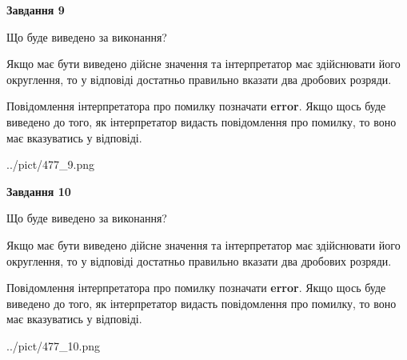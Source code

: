 \documentclass[12pt, ukrainian]{article}
\begin{document}
{\begin {Large}
{\begin {center}\textbf{Завдання 9}\end {center}}\par
Що буде виведено за виконання? \par

Якщо має бути виведено дійсне значення та інтерпретатор має здійснювати його округлення, 
то у відповіді достатньо правильно вказати два дробових розряди.

Повідомлення інтерпретатора про помилку позначати \textbf{error}.
Якщо щось буде виведено до того, як інтерпретатор видасть повідомлення про помилку, 
то воно має вказуватись у відповіді. \par

\begin{center}
	{../pict/477_9.png}
\end{center}
\newpage

{\begin {center}\textbf{Завдання 10}\end {center}}\par
Що буде виведено за виконання? \par

Якщо має бути виведено дійсне значення та інтерпретатор має здійснювати його округлення, 
то у відповіді достатньо правильно вказати два дробових розряди.

Повідомлення інтерпретатора про помилку позначати \textbf{error}.
Якщо щось буде виведено до того, як інтерпретатор видасть повідомлення про помилку, 
то воно має вказуватись у відповіді. \par

\begin{center}
	{../pict/477_10.png}
\end{center}
\newpage

\end {Large}}
\end{document}
